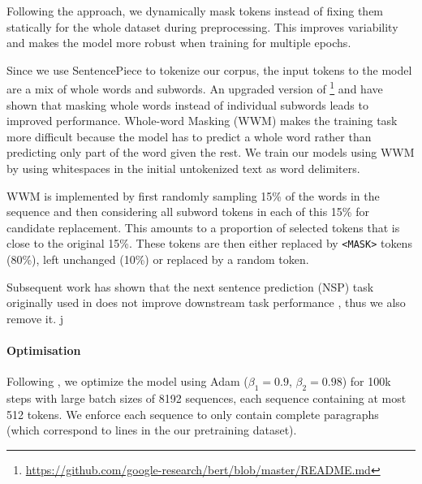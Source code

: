 Following the \roberta approach, we dynamically mask tokens instead of fixing them statically for the whole dataset during preprocessing. This improves variability and makes the model more robust when training for multiple epochs.

Since we use SentencePiece to tokenize our corpus, the input tokens to the model are a mix of whole words and subwords.
An upgraded version of \bert\footnote{\url{https://github.com/google-research/bert/blob/master/README.md}} and \citet{joshi-etal-2020-spanbert} have shown that masking whole words instead of individual subwords leads to improved performance.
Whole-word Masking (WWM) makes the training task more difficult because the model has to predict a whole word rather than predicting only part of the word given the rest.
We train our models using WWM by using whitespaces in the initial untokenized text as word delimiters.

WWM is implemented by first randomly sampling 15\% of the words in the sequence and then considering all subword tokens in each of this 15\% for candidate replacement. This amounts to a proportion of selected tokens that is close to the original 15\%.
These tokens are then either replaced by \texttt{<MASK>} tokens (80\%), left unchanged (10\%) or replaced by a random token.

Subsequent work has shown that the next sentence prediction (NSP) task originally used in \bert does not improve downstream task performance \cite{conneau-lample-2019-cross,liu-etal-2019-roberta}, thus we also remove it.
j


\paragraph{Optimisation}
Following \citep{liu-etal-2019-roberta}, we optimize the model using Adam \cite{kingma-ba-2015-adam} ($\beta_1 = 0.9$, $\beta_2 = 0.98$) for 100k steps with large batch sizes of 8192 sequences, each sequence containing at most 512 tokens.
We enforce each sequence to only contain complete paragraphs (which correspond to lines in the our pretraining dataset).

